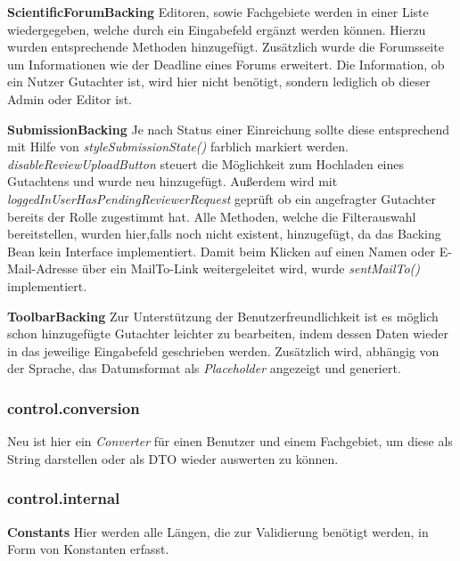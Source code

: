 \textbf{ScientificForumBacking} Editoren, sowie Fachgebiete werden in einer Liste wiedergegeben, welche durch ein Eingabefeld ergänzt werden können. Hierzu wurden entsprechende Methoden hinzugefügt. \newline
Zusätzlich wurde die Forumsseite um Informationen wie der Deadline eines Forums erweitert.\newline
Die Information, ob ein Nutzer Gutachter ist, wird hier nicht benötigt, sondern lediglich ob dieser Admin oder Editor ist.

\textbf{SubmissionBacking} Je nach Status einer Einreichung sollte diese entsprechend mit Hilfe von \emph{styleSubmissionState()} farblich markiert werden. \newline
\emph{disableReviewUploadButton} steuert die Möglichkeit zum Hochladen eines Gutachtens und wurde neu hinzugefügt. \newline Außerdem wird mit  \emph{loggedInUserHasPendingReviewerRequest} geprüft ob ein angefragter Gutachter bereits der Rolle zugestimmt hat. \newline
Alle Methoden, welche die Filterauswahl bereitstellen, wurden hier,falls noch nicht existent, hinzugefügt, da das Backing Bean kein Interface implementiert.
\newline Damit beim Klicken auf einen Namen oder E-Mail-Adresse über ein MailTo-Link weitergeleitet wird, wurde \emph{sentMailTo()} implementiert.

\textbf{ToolbarBacking} Zur Unterstützung der Benutzerfreundlichkeit ist es möglich schon hinzugefügte Gutachter leichter zu bearbeiten, indem dessen Daten wieder in das jeweilige Eingabefeld geschrieben werden. Zusätzlich wird, abhängig von der Sprache, das Datumsformat als \emph{Placeholder} angezeigt und generiert.

\subsubsection{control.conversion}

Neu ist hier ein \emph{Converter} für einen Benutzer und einem Fachgebiet, um diese als String darstellen oder als DTO wieder auswerten zu können.

\subsubsection{control.internal}

\textbf{Constants} Hier werden alle Längen, die zur Validierung benötigt werden, in Form von Konstanten erfasst.

